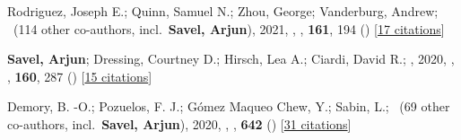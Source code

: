 \item[{\color{numcolor}\scriptsize3}] Rodriguez, Joseph E.; Quinn, Samuel N.; Zhou, George; Vanderburg, Andrew; \etal\ ({114} other co-authors, incl.\ \textbf{Savel, Arjun}), 2021, , \aj, \textbf{161}, 194 () [\href{https://ui.adsabs.harvard.edu/abs/2021AJ....161..194R}{17 citations}]

\item[{\color{numcolor}\scriptsize2}] \textbf{Savel, Arjun}; Dressing, Courtney D.; Hirsch, Lea A.; Ciardi, David R.; \etal, 2020, , \aj, \textbf{160}, 287 () [\href{https://ui.adsabs.harvard.edu/abs/2020AJ....160..287S}{15 citations}]

\item[{\color{numcolor}\scriptsize1}] Demory, B. -O.; Pozuelos, F. J.; G{\'o}mez Maqueo Chew, Y.; Sabin, L.; \etal\ ({69} other co-authors, incl.\ \textbf{Savel, Arjun}), 2020, , \aanda, \textbf{642} () [\href{https://ui.adsabs.harvard.edu/abs/2020A&A...642A..49D}{31 citations}]